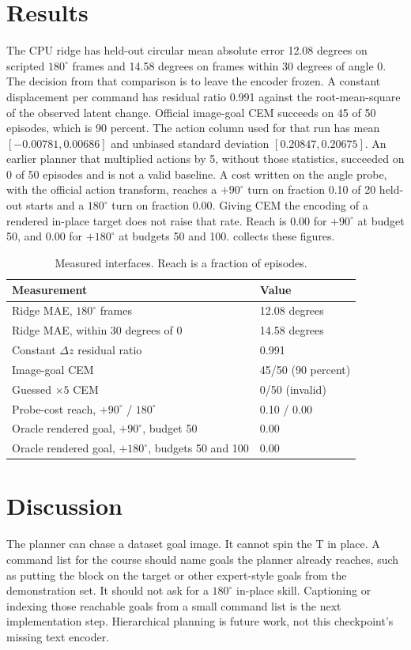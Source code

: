 \documentclass[11pt,a4paper]{article}
\begin{document}
\section{Results}
The CPU ridge has held-out circular mean absolute error 12.08 degrees on scripted $180^{\circ}$ frames and 14.58 degrees on frames within 30 degrees of angle 0.
The decision from that comparison is to leave the encoder frozen.
A constant displacement per command has residual ratio 0.991 against the root-mean-square of the observed latent change.
Official image-goal CEM succeeds on 45 of 50 episodes, which is 90 percent.
The action column used for that run has mean $[-0.00781, 0.00686]$ and unbiased standard deviation $[0.20847, 0.20675]$.
An earlier planner that multiplied actions by 5, without those statistics, succeeded on 0 of 50 episodes and is not a valid baseline.
A cost written on the angle probe, with the official action transform, reaches a $+90^{\circ}$ turn on fraction 0.10 of 20 held-out starts and a $180^{\circ}$ turn on fraction 0.00.
Giving CEM the encoding of a rendered in-place target does not raise that rate.
Reach is 0.00 for $+90^{\circ}$ at budget 50, and 0.00 for $+180^{\circ}$ at budgets 50 and 100.
 collects these figures.

\begin{table}[t]
\centering
\caption{Measured interfaces. Reach is a fraction of episodes.}
\label{tab:status}
\begin{tabular}{ll}
\toprule
Measurement & Value \\
\midrule
Ridge MAE, $180^{\circ}$ frames & 12.08 degrees \\
Ridge MAE, within 30 degrees of 0 & 14.58 degrees \\
Constant $\Delta z$ residual ratio & 0.991 \\
Image-goal CEM & 45/50 (90 percent) \\
Guessed $\times 5$ CEM & 0/50 (invalid) \\
Probe-cost reach, $+90^{\circ}$ / $180^{\circ}$ & 0.10 / 0.00 \\
Oracle rendered goal, $+90^{\circ}$, budget 50 & 0.00 \\
Oracle rendered goal, $+180^{\circ}$, budgets 50 and 100 & 0.00 \\
\bottomrule
\end{tabular}
\end{table}

\section{Discussion}
The planner can chase a dataset goal image.
It cannot spin the T in place.
A command list for the course should name goals the planner already reaches, such as putting the block on the target or other expert-style goals from the demonstration set.
It should not ask for a $180^{\circ}$ in-place skill.
Captioning or indexing those reachable goals from a small command list is the next implementation step.
Hierarchical planning is future work, not this checkpoint's missing text encoder.
\end{document}
